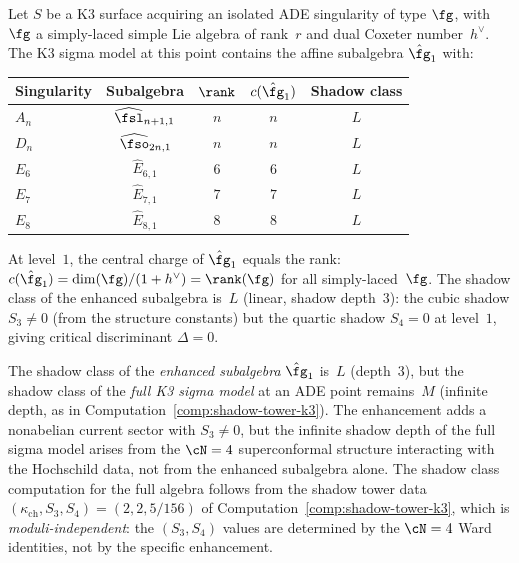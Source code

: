 \begin{proposition}
\label{prop:k3-ade-enhancement}
\ClaimStatusProvedElsewhere
Let $S$ be a K3 surface acquiring an isolated ADE singularity of
type $\fg$, with $\fg$ a simply-laced simple Lie algebra of rank~$r$
and dual Coxeter number~$h^\vee$.
The K3 sigma model at this point contains the affine subalgebra
$\hat{\fg}_1$ with:
\begin{center}
\renewcommand{\arraystretch}{1.3}
\begin{tabular}{lcccc}
\toprule
\textbf{Singularity} & \textbf{Subalgebra} & $\rank$ & $c(\hat{\fg}_1)$ & \textbf{Shadow class} \\
\midrule
$A_n$ & $\widehat{\fsl}_{n+1,1}$ & $n$ & $n$ & $L$ \\
$D_n$ & $\widehat{\fso}_{2n,1}$ & $n$ & $n$ & $L$ \\
$E_6$ & $\hat{E}_{6,1}$ & $6$ & $6$ & $L$ \\
$E_7$ & $\hat{E}_{7,1}$ & $7$ & $7$ & $L$ \\
$E_8$ & $\hat{E}_{8,1}$ & $8$ & $8$ & $L$ \\
\bottomrule
\end{tabular}
\end{center}
At level~$1$, the central charge of $\hat{\fg}_1$ equals the rank:
$c(\hat{\fg}_1) = \dim(\fg)/(1 + h^\vee) = \rank(\fg)$ for all
simply-laced~$\fg$.  The shadow class of the enhanced subalgebra is~$L$
\textup{(}linear, shadow depth~$3$\textup{)}: the cubic shadow $S_3 \neq 0$
\textup{(}from the structure constants\textup{)} but the quartic shadow
$S_4 = 0$ at level~$1$, giving critical discriminant $\Delta = 0$.
\end{proposition}

\begin{remark}
\label{rem:k3-ade-shadow-subalgebra-vs-full}
The shadow class of the \emph{enhanced subalgebra} $\hat{\fg}_1$ is~$L$
(depth~$3$), but the shadow class of the \emph{full K3 sigma model}
at an ADE point remains~$M$ (infinite depth, as in
Computation~\ref{comp:shadow-tower-k3}).  The enhancement adds
a nonabelian current sector with $S_3 \neq 0$, but the infinite
shadow depth of the full sigma model arises from the
$\cN = 4$ superconformal structure interacting with the
Hochschild data, not from the enhanced subalgebra alone.
The shadow class computation for the full algebra follows
from the shadow tower data $(\kappa_{\mathrm{ch}}, S_3, S_4) = (2, 2, 5/156)$
of Computation~\ref{comp:shadow-tower-k3}, which is
\emph{moduli-independent}: the $(S_3, S_4)$ values are determined
by the $\cN = 4$ Ward identities, not by the specific enhancement.
\end{remark}

